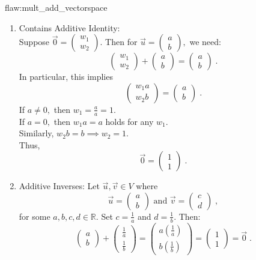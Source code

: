 \begin{flaw}{flaw:mult_add_vectorspace}
\begin{enumerate}
\item Contains Additive Identity: \\
Suppose $\vec{0} = \begin{pmatrix}
w_1 \\
w_2
\end{pmatrix}.$ Then for $\vec{u} = \begin{pmatrix}
a \\
b
\end{pmatrix},$ we need:
$$\begin{pmatrix}
w_1 \\
w_2
\end{pmatrix} + \begin{pmatrix}
a \\
b
\end{pmatrix} = \begin{pmatrix}
a \\
b
\end{pmatrix}\;.$$
In particular, this implies
$$\begin{pmatrix}
w_1a \\
w_2b
\end{pmatrix} = \begin{pmatrix}
a \\
b
\end{pmatrix}\;.$$
If $a \neq 0,$ then $w_1 = \frac{a}{a} = 1.$ \\
If $a = 0,$ then $w_1a=a$ holds for any $w_1$. \\
Similarly, $w_2b=b \implies w_2=1$. \\
Thus, $$\vec{0} = \begin{pmatrix}
1 \\
1
\end{pmatrix}\;.$$

\item Additive Inverses: Let $\vec{u}, \vec{v} \in V$ where $$ \vec{u} = \begin{pmatrix}
a \\
b
\end{pmatrix} \text{ and } \vec{v} = \begin{pmatrix}
c \\
d
\end{pmatrix}\;,$$
for some $a,b,c,d \in \mathbb{R}.$ Set $c= \frac1a$ and $d=\frac1b$. Then:
$$\begin{pmatrix}
a \\
b
\end{pmatrix} + \begin{pmatrix}
\frac1a \\
\frac1b
\end{pmatrix} = \begin{pmatrix}
a\left(\frac1a\right) \\
b\left(\frac1b\right) \end{pmatrix} = \begin{pmatrix}
1 \\
1
\end{pmatrix} = \vec{0}\;.$$


\end{enumerate}
\end{flaw}
